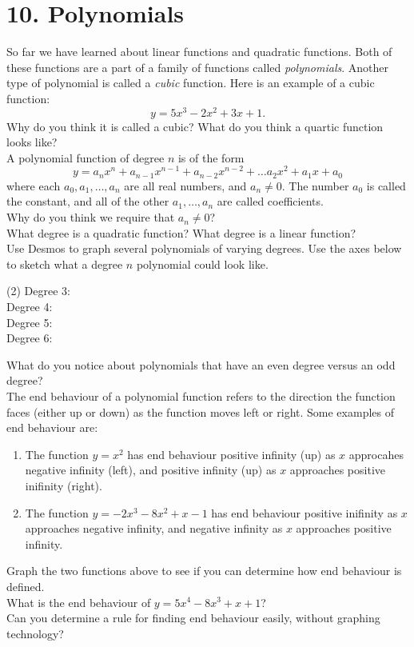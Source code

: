 \documentclass[12pt,fleqn]{book}
\begin{document}
\chapter{10. Polynomials}
So far we have learned about linear functions and quadratic functions.  Both of these functions are a part of a family of functions called \emph{polynomials}.  Another type of polynomial is called a \emph{cubic} function.  Here is an example of a cubic function:
\[y = 5x^3 - 2x^2 + 3x + 1.\]
Why do you think it is called a cubic?  What do you think a quartic function looks like?
\\[1in]
A polynomial function of degree $n$ is of the form
\[ y=a_nx^n + a_{n-1}x^{n-1} + a_{n-2}x^{n-2} + \ldots a_2 x^2 + a_1 x + a_0 \]
where each $a_0, a_1, \ldots, a_n$ are all real numbers, and $a_n\ne 0$.  The number $a_0$ is called the constant, and all of the other $a_1,\ldots,a_n$ are called coefficients.
\\[1em]
Why do you think we require that $a_n\ne 0$?
\\[1in]
What degree is a quadratic function?  What degree is a linear function?
\\[1in]
Use Desmos to graph several polynomials of varying degrees.  Use the axes below to sketch what a degree $n$ polynomial could look like.
\begin{tasks}(2)
	\task Degree 3:\\ 
	\task Degree 4:\\ 
	\task Degree 5:\\ 
	\task Degree 6:\\ 
\end{tasks}
What do you notice about polynomials that have an even degree versus an odd degree?
\\[2in]
The end behaviour of a polynomial function refers to the direction the function faces (either up or down) as the function moves left or right.  Some examples of end behaviour are:
\begin{enumerate}
	\item The function $y=x^2$ has end behaviour positive infinity (up) as $x$ approcahes negative infinity (left), and positive infinity (up) as $x$ approaches positive inifinity (right).
	\item The function $y=-2x^3-8x^2+x-1$ has end behaviour positive inifinity as $x$ approaches negative infinity, and negative infinity as $x$ approaches positive infinity.
\end{enumerate}
Graph the two functions above to see if you can determine how end behaviour is defined.
\\[1em]
What is the end behaviour of $y=5x^4 - 8x^3 + x + 1$?
\\[10em]
Can you determine a rule for finding end behaviour easily, without graphing technology?
\clearpage
\end{document}
